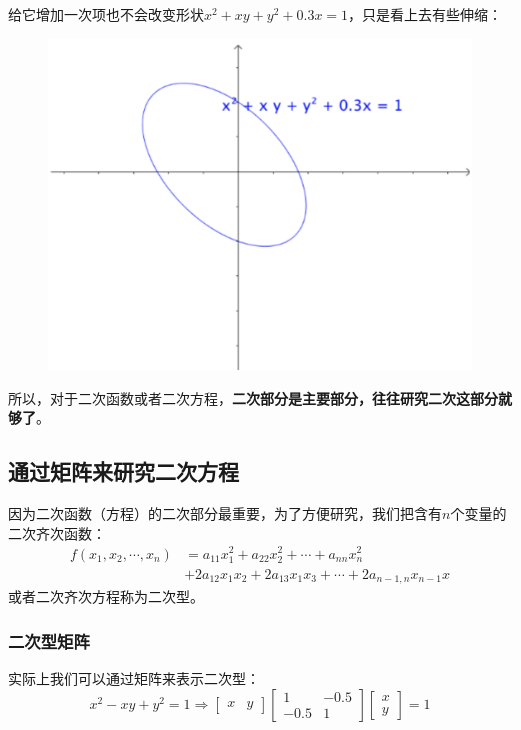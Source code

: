 \documentclass[12pt]{article}
\begin{document}
给它增加一次项也不会改变形状$x^2 + xy + y^2 + 0.3x = 1$，只是看上去有些伸缩：
\begin{figure}[H]
    \centering
    \includegraphics[width=.8\textwidth]{fig/UnderstandQuadraticForm_2.png}
\end{figure} 

所以，对于二次函数或者二次方程，\textbf{二次部分是主要部分，往往研究二次这部分就够了}。

\subsection{通过矩阵来研究二次方程}
因为二次函数（方程）的二次部分最重要，为了方便研究，我们把含有$n$个变量的二次齐次函数：
\begin{align*}
f(x_1, x_2, \cdots, x_n) &= a_{11}x_1^2 + a_{22}x_2^2 + \cdots + a_{nn}x_n^2 \\
 &+ 2a_{12}x_1x_2 + 2a_{13}x_1x_3 + \cdots + 2a_{n-1,n}x_{n-1}x
\end{align*}
或者二次齐次方程称为二次型。

\subsubsection{二次型矩阵}
实际上我们可以通过矩阵来表示二次型：
$$
x^2 - xy + y^2 = 1 \Rightarrow 
\begin{bmatrix}x & y\end{bmatrix}
\begin{bmatrix}1&-0.5\\-0.5&1\end{bmatrix}
\begin{bmatrix}x \\ y\end{bmatrix} = 1
$$
\end{document}
